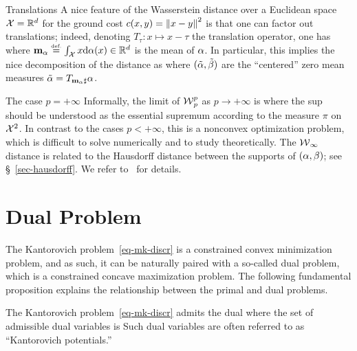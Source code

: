 \begin{rem1}{Translations}
A nice feature of the Wasserstein distance over a Euclidean space $\mathcal{X}=\mathbb{R}^d$ for the ground cost $c(x,y)=\left\| x-y \right\|^2$ is that one can factor out translations; indeed, denoting $T_{\tau} : x \mapsto x-\tau$ the translation operator, one has
where $\mean_{\al} \eqdef \int_\X x \d\al(x) \in \RR^\dim$ is the mean of $\alpha$.
%
In particular, this implies the nice decomposition of the distance as
where $(\tilde{\alpha},\tilde{\beta})$ are the ``centered'' zero mean measures $\tilde{\alpha}=T_{\mathbf{m}_{\alpha}\sharp}\alpha$.
\end{rem1}
\pagebreak
\begin{rem1}{The case $p = +\infty$}\label{rem-p-inf}
Informally, the limit of $\operatorname{\mathcal{W}}_p^p$ as $p \rightarrow +\infty$ is
where the sup should be understood as the essential supremum according to the measure $\pi$ on $\mathcal{X}^2$.
%
In contrast to the cases $p<+\infty$, this is a nonconvex optimization problem, which is difficult to solve numerically and to study theoretically. The $\operatorname{\mathcal{W}}_{\infty}$ distance is related to the Hausdorff distance between the supports of $(\alpha,\beta)$; see \S~\ref{sec-hausdorff}. We refer to~\citep{champion2008wasserstein} for details.
\end{rem1}



\section{Dual Problem}

The Kantorovich problem~\eqref{eq-mk-discr} is a constrained convex minimization problem, and as such, it can be naturally paired with a so-called dual problem, which is a constrained concave maximization problem. The following fundamental proposition explains the relationship between the primal and dual problems.

\begin{prop}\label{prop-duality-discr}
The Kantorovich problem~\eqref{eq-mk-discr} admits the dual
\eql{\label{eq-dual}
	\MKD_\C(\a,\b) =
	\umax{(\fD,\gD) \in \PotentialsD(\C)} \dotp{\fD}{\a} + \dotp{\gD}{\b},
}
where the set of admissible dual variables is
Such dual variables are often referred to as ``Kantorovich potentials.''
\end{prop}

